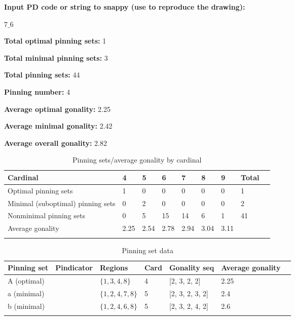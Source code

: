 \documentclass{article}%
\begin{document}
%
\small

\begin{multicols}{2}
\noindent\textbf{Input PD code or string to snappy (use to reproduce the drawing):}

	$7\_6$


\columnbreak

\noindent\textbf{Total optimal pinning sets:} 1

\noindent\textbf{Total minimal pinning sets:} 3

\noindent\textbf{Total pinning sets:} 44

\noindent\textbf{Pinning number:} 4

\noindent\textbf{Average optimal gonality:} 2.25

\noindent\textbf{Average minimal gonality:} 2.42

\noindent\textbf{Average overall gonality:} 2.82


\end{multicols}

\begin{table}[ht]
	\caption{Pinning sets/average gonality by cardinal}
	\centering
	\renewcommand{\arraystretch}{1.5}
	\begin{tabularx}{\textwidth}{lXXXXXXXX}
		\toprule
			Cardinal & 4 & 5 & 6 & 7 & 8 & 9 & Total\\
			\hline
			Optimal pinning sets & 1 & 0 & 0 & 0 & 0 & 0 & 1 \\
			Minimal (suboptimal) pinning sets & 0 & 2 & 0 & 0 & 0 & 0 & 2 \\
			Nonminimal pinning sets & 0 & 5 & 15 & 14 & 6 & 1 & 41 \\
			Average gonality & 2.25 & 2.54 & 2.78 & 2.94 & 3.04 & 3.11 &  \\
		\bottomrule \\ 
	\end{tabularx}
\end{table}

\begin{table}[ht]
	\caption{Pinning set data}
	\centering
	\renewcommand{\arraystretch}{1.5}
	\begin{tabularx}{\textwidth}{lXXXXXX}
		\toprule
			Pinning set & Pindicator & Regions & Card & Gonality seq & Average gonality\\
			\hline
			A (optimal) & {\Huge\textcolor{red0}{\textbullet}} & $\{1,3,4,8\}$ & 4 & [2, 3, 2, 2] & 2.25 \\
			a (minimal) & {\Huge\textcolor{green0}{\textbullet}} & $\{1,2,4,7,8\}$ & 5 & [2, 3, 2, 3, 2] & 2.4 \\
			b (minimal) & {\Huge\textcolor{green5}{\textbullet}} & $\{1,2,4,6,8\}$ & 5 & [2, 3, 2, 4, 2] & 2.6 \\
		\bottomrule \\ 
	\end{tabularx}
\end{table}
\end{document}
